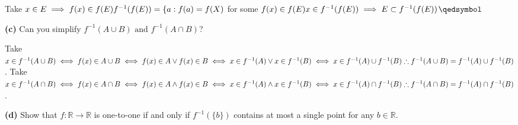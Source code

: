 \documentclass[12pt]{article}
\newcommand{\R}{\mathbb{R}}
\begin{document}
\begin{solution}\newline
Take $x\in E\newline
\implies f(x)\in f(E)\newline
f^{-1}(f(E))=\{a:f(a)=f(X)$ for some $f(x)\in f(E)\newline
x\in f^{-1}(f(E))\newline
\implies E\subset f^{-1}(f(E))$\flushright$\qedsymbol$
\end{solution}
\begin{subproblem}\textbf{(c)}
Can you simplify $f^{-1}(A\cup B)\text{ and }f^{-1}(A\cap B)$?
\end{subproblem}

\begin{solution}\newline
Take $x\in f^{-1}(A\cup B)\newline
\iff f(x)\in A\cup B\newline
\iff f(x)\in A \lor f(x)\in B\newline
\iff x\in f^{-1}(A)\lor x\in f^{-1}(B)\newline
\iff x\in f^{-1}(A)\cup f^{-1}(B)\newline
\therefore f^{-1}(A\cup B)=f^{-1}(A)\cup f^{-1}(B)$.\newline\newline
Take $x\in f^{-1}(A\cap B)\newline
\iff f(x)\in A\cap B\newline
\iff f(x)\in A\land f(x)\in B\newline
\iff x\in f^{-1}(A)\land x\in f^{-1}(B)\newline
\iff x\in f^{-1}(A)\cap f^{-1}(B)\newline
\therefore f^{-1}(A\cap B)=f^{-1}(A)\cap f^{-1}(B)$.
\end{solution}
\newpage
\begin{subproblem}\textbf{(d)}
Show that $f:\R\to\R$ is one-to-one if and only if $f^{-1}(\{b\})$ contains at most a single point for any $b\in\R$.
\end{subproblem}
\end{document}
